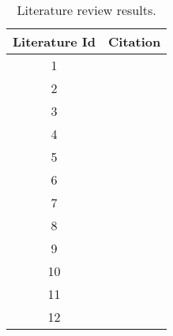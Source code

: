 \begin{table}[ht!]
    \begin{tabular}{|c c |} 
        \hline
        Literature Id
        & Citation
        \\ 
        \hline\hline
        1
        & \cite{Dafni}
        \\ 
        
        2
        & \cite{Tilkov}
        \\ 
        
        3
        & \cite{Chitra}
        \\ 
        
        4
        & \cite{Shkodra}
        \\ 
        
        5
        & \cite{Chaniotis}
        \\ 
        
        6
        & \cite{NkenyereyeLionel2016PEoN}
        \\ 
        
        7
        & \cite{faustino}
        \\ 
        
        8
        & \cite{Challapalli}
        \\ 
        
        9
        & \cite{Kyriakou}
        \\ 
        
        10
        & \cite{Kyriakou}
        \\ 
        
        11
        & \cite{Lei}
        \\ 
        
        12
        & \cite{SelakovicPerformanceIssues}
        \\ 
        \hline
    \end{tabular}    
    \caption{Literature review results.}
    \label{table:literature:results}
\end{table}


